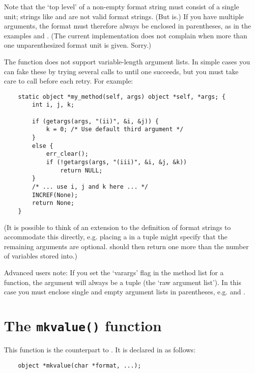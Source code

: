 Note that the `top level' of a non-empty format string must consist of
a single unit; strings like  and  are not valid
format strings.  (But  is.)  If you have multiple arguments,
the format must therefore always be enclosed in parentheses, as in the
examples  and .  (The current
implementation does not complain when more than one unparenthesized
format unit is given.  Sorry.)

The  function does not support variable-length
argument lists.  In simple cases you can fake these by trying several
calls to
 until one succeeds, but you must take care to call
 before each retry.  For example:

\begin{verbatim}
    static object *my_method(self, args) object *self, *args; {
        int i, j, k;

        if (getargs(args, "(ii)", &i, &j)) {
            k = 0; /* Use default third argument */
        }
        else {
            err_clear();
            if (!getargs(args, "(iii)", &i, &j, &k))
                return NULL;
        }
        /* ... use i, j and k here ... */
        INCREF(None);
        return None;
    }
\end{verbatim}

(It is possible to think of an extension to the definition of format
strings to accommodate this directly, e.g. placing a \samp{|} in a
tuple might specify that the remaining arguments are optional.
 should then return one more than the number of
variables stored into.)

Advanced users note: If you set the `varargs' flag in the method list
for a function, the argument will always be a tuple (the `raw argument
list').  In this case you must enclose single and empty argument lists
in parentheses, e.g.  and \samp{()}.


\section{The {\tt mkvalue()} function}

This function is the counterpart to .  It is declared
in  as follows:

\begin{verbatim}
    object *mkvalue(char *format, ...);
\end{verbatim}

